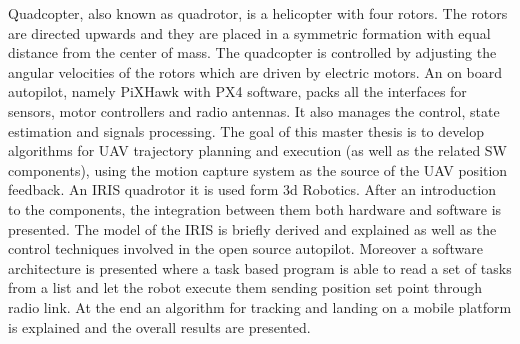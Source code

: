 

\begin{abstracts}

Quadcopter, also known as quadrotor, is a helicopter with four rotors. The rotors are directed upwards and they are placed in a symmetric formation with equal distance from the center of mass. The quadcopter is controlled by adjusting the angular velocities of the rotors which are driven by electric motors. An on board autopilot, namely PiXHawk with PX4 software, packs all the interfaces for sensors, motor controllers and radio antennas. It also manages the control, state estimation and signals processing. The goal of this master thesis is to develop algorithms for UAV trajectory planning and execution (as well as the related SW components), using the motion capture system as the source of the UAV position feedback. An IRIS quadrotor it is used form 3d Robotics. After an introduction to the components, the integration between them both hardware and software is presented. The model of the IRIS is briefly derived and explained as well as the control techniques involved in the open source autopilot. Moreover a software architecture is presented where a task based program is able to read a set of tasks from a list and let the robot execute them sending position set point through radio link. At the end an algorithm for tracking and landing on a mobile platform is explained and the overall results are presented.

\end{abstracts}